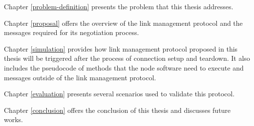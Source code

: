 Chapter \ref{problem-definition} presents the problem that this thesis addresses.

Chapter \ref{proposal} offers the overview of the link management protocol and the messages required for its negotiation process.

Chapter \ref{simulation} provides how link management protocol proposed in this thesis will be triggered after the process of connection setup and teardown. It also includes the pseudocode of methods that the node software need to execute and messages outside of the link management protocol.

Chapter \ref{evaluation} presents several scenarios used to validate this protocol.

Chapter \ref{conclusion} offers the conclusion of this thesis and discusses future works.



